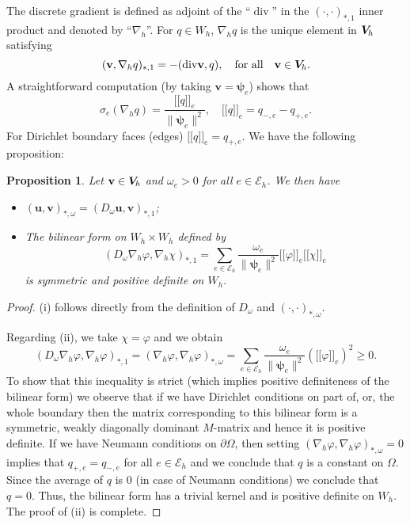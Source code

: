 \documentclass[11pt]{amsart}
\numberwithin{equation}{section}
\newtheorem{proposition}[theorem]{Proposition}
\theoremstyle{definition}\newtheorem{example}{Example}[section]
\begin{document}
The discrete gradient is defined as adjoint of the ``${\operatorname{div}}$'' in the 
$(\cdot,\cdot)_{*,1}$ inner product and denoted by ``$\nabla_h$''. For
$q\in W_h$, $\nabla_h q$ is the unique element in ${{\boldsymbol V}_{\hspace{-0.2mm}h}}$ satisfying
\begin{equation}\label{discrete-grad}
({{\mathbf v}},\nabla_h q)_{*,1}  = -({\operatorname{div}} {{\mathbf v}},q),
\quad\mbox{for all}\quad {{\mathbf v}}\in{{\boldsymbol V}_{\hspace{-0.2mm}h}}.
\end{equation}
A straightforward computation (by taking ${{\mathbf v}}={{\boldsymbol \psi}}_e$)  shows that 
$$
\sigma_e(\nabla_h q) = 
\frac{{\lbrack\!\lbrack {q} \rbrack\!\rbrack}_e}{\|{{\boldsymbol \psi}}_e\|^2}, \quad {\lbrack\!\lbrack {q} \rbrack\!\rbrack}_e = q_{-,e}-q_{+,e}.
$$
For Dirichlet boundary faces (edges) ${\lbrack\!\lbrack {q} \rbrack\!\rbrack}_e=q_{+,e}$. 
We have the following proposition:
\begin{proposition}\label{proposition:simple} 
Let ${{\mathbf v}}\in {{\boldsymbol V}_{\hspace{-0.2mm}h}}$ and $\omega_e>0$ for all
  $e\in \mathcal{E}_h$. We then have 
\begin{itemize}
\item[(i)] $({{\mathbf u}},{{\mathbf v}})_{*,\omega}= (D_\omega {{\mathbf u}}, {{\mathbf v}})_{*,1}$;
\item[(ii)]  The bilinear form on $W_h\times W_h$ defined by
\[
(D_\omega \nabla_h \varphi,\nabla_h \chi)_{*,1} = 
\sum_{e\in\mathcal{E}_h}
\frac{\omega_e}{\| {{\boldsymbol \psi}}_e\|^2}{\lbrack\!\lbrack {\varphi} \rbrack\!\rbrack}_e{\lbrack\!\lbrack {\chi} \rbrack\!\rbrack}_e
\]
is symmetric and positive definite on $W_h$. 
\end{itemize}
\end{proposition}
\begin{proof} (i) follows directly from the definition of
  $D_\omega$ and $(\cdot,\cdot)_{*,\omega}$. 

Regarding (ii), we take $\chi=\varphi$ and we obtain
\[
(D_\omega \nabla_h \varphi,\nabla_h \varphi)_{*,1} =
(\nabla_h \varphi,\nabla_h \varphi)_{*,\omega} = 
\sum_{e\in\mathcal{E}_h}
\frac{\omega_e}{\|{{\boldsymbol \psi}}_e\|^2}({\lbrack\!\lbrack {\varphi} \rbrack\!\rbrack}_e)^2\ge 0.
\]
To show that this inequality is strict (which implies positive
definiteness of the bilinear form) we observe that if we have Dirichlet
conditions on part of, or, the whole boundary then the matrix
corresponding to this bilinear form is a symmetric, weakly diagonally
dominant $M$-matrix and hence it is positive definite. If we have
Neumann conditions on $\partial\Omega$,  then setting 
$(\nabla_h \varphi,\nabla_h \varphi)_{*,\omega}=0$ implies that
$q_{+,e}=q_{-,e}$ for all $e\in \mathcal{E}_h$ and we conclude that $q$
is a constant on $\Omega$. Since the average of $q$ is $0$ (in case of
Neumann conditions) we conclude that $q=0$. Thus, the bilinear form
has a trivial kernel and is positive definite on $W_h$. The proof of (ii) is
complete. 
\end{proof}
\end{document}
